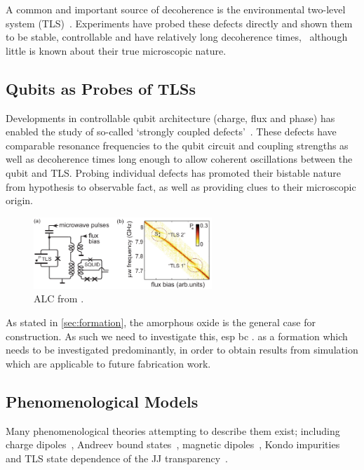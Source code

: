 A common and important source of decoherence is the environmental two-level system (TLS)~\cite{Dutta1981, Shnirman2005}.
Experiments have probed these defects directly and shown them to be stable, controllable and have relatively long decoherence times,~\cite{Simmonds2004, Neeley2008, Shalibo2010, Lupascu2009, Lisenfeld2010, Gunnarsson2013} although little is known about their true microscopic nature.


\subsection{Qubits as Probes of TLSs}\label{sec:probes}


Developments in controllable qubit architecture (charge, flux and phase) has enabled the study of so-called `strongly coupled defects'~\cite{Neeley2008, Lupascu2009, Lisenfeld2010}.
These defects have comparable resonance frequencies to the qubit circuit and coupling strengths as well as decoherence times long enough to allow coherent oscillations between the qubit and TLS.
Probing individual defects has promoted their bistable nature from hypothesis to observable fact, as well as providing clues to their microscopic origin.


\begin{figure}[htp]
\includegraphics[width=0.6\textwidth]{figures/alclisenfeld2010}
\caption[ALC]{\label{fig:alc}ALC from \citeauthor{Lisenfeld2010}.}
\end{figure}

As stated in \cref{sec:formation}, the amorphous oxide is the general case for construction.
As such we need to investigate this, esp bc \cite{Oh2006}.
as a formation which needs to be investigated predominantly, in order to obtain results from simulation which are applicable to future fabrication work.

\subsection{Phenomenological Models}

Many phenomenological theories attempting to describe them exist; including charge dipoles~\cite{Martinis2005}, Andreev bound states~\cite{DeSousa2009}, magnetic dipoles~\cite{Sendelbach2008}, Kondo impurities~\cite{Faoro2007} and TLS state dependence of the JJ transparency~\cite{Ku2005}.


